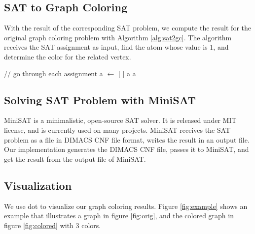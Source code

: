 \documentclass[11pt,letterpaper,oneside]{article}
\begin{document}
\subsection{SAT to Graph Coloring}
With the result of the corresponding SAT problem, we compute the result for the original graph coloring problem with Algorithm \ref{alg:sat2gc}. The algorithm receives the SAT assignment as input, find the atom whose value is 1, and determine the color for the related vertex.

\begin{algorithm}[!h]
\DontPrintSemicolon
{}
// go through each assignment\;
a $\leftarrow$ [ ]\;
 {
\Return a\;
}
\Return a\;
\caption{$\textsc{GC-from-SAT}(SAT\ assignment\ v, limit\ k\ colors):$}
\label{alg:sat2gc}
\end{algorithm}

\subsection{Solving SAT Problem with MiniSAT}
MiniSAT is a minimalistic, open-source SAT solver. It is released under MIT license, and is currently used on many projects. MiniSAT receives the SAT problem as a file in DIMACS CNF file format, writes the result in an output file. Our implementation generates the DIMACS CNF file, passes it to MiniSAT, and get the result from the output file of MiniSAT.

\subsection{Visualization}
We use dot \cite{dot} to visualize our graph coloring results. Figure \ref{fig:example} shows an example that illustrates a graph in figure \ref{fig:orig}, and the colored graph in figure \ref{fig:colored} with 3 colors.
\end{document}
